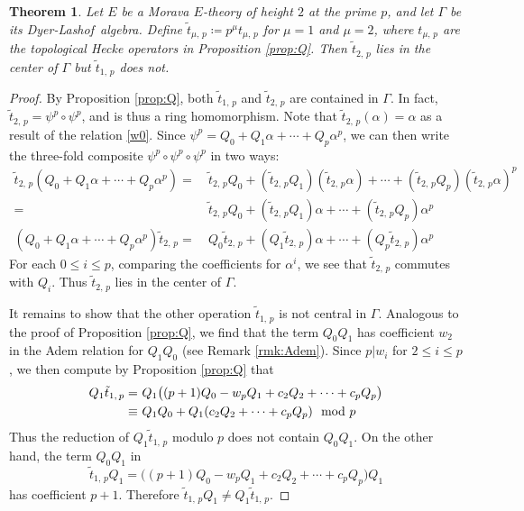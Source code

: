 \documentclass{gtpart}
\newtheorem{thm}{Theorem}
\theoremstyle{definition}
\theoremstyle{remark}
\newcommand{\DL}{Dyer-Lashof~}
\newcommand{\md}{~~{\rm mod}~}
\newcommand{\A}{\alpha}
\newcommand{\G}{\Gamma}
\newcommand{\ce}{\coloneqq}
\renewcommand{\=}{\approx}
\renewcommand{\-}{\sim}
\numberwithin{equation}{section}
\numberwithin{thm}{section}
\begin{document}
\begin{thm}
 \label{thm:center}
 Let $E$ be a Morava $E$-theory of height $2$ at the prime $p$, and let $\G$ be its \DL algebra.  
 Define $\tilde{t}_{\mu,\,p} \ce p^\mu t_{\mu,\,p}$ for $\mu = 1$ and $\mu = 2$, 
 where $t_{\mu,\,p}$ are the topological Hecke operators in Proposition \ref{prop:Q}.  
 Then $\tilde{t}_{2,\,p}$ lies in the center of $\G$ but $\tilde{t}_{1,\,p}$ does not.  
\end{thm}
\begin{proof}
 By Proposition \ref{prop:Q}, both $\tilde{t}_{1,\,p}$ and $\tilde{t}_{2,\,p}$ are 
 contained in $\G$.  In fact, $\tilde{t}_{2,\,p} = \psi^p \circ \psi^p$, and is thus a 
 ring homomorphism.  
 Note that $\tilde{t}_{2,\,p}(\A) = \A$ as a result of the relation \eqref{w0}.  Since 
 $\psi^p = Q_0 + Q_1 \A + \cdots + Q_p \A^p$, we can then write the three-fold 
 composite $\psi^p \circ \psi^p \circ \psi^p$ in two ways: 
 \begin{equation*}
  \begin{split}
   \tilde{t}_{2,\,p} (Q_0 + Q_1 \A + \cdots + Q_p \A^p) = & ~ \tilde{t}_{2,\,p} Q_0 + (\tilde{t}_{2,\,p} Q_1) (\tilde{t}_{2,\,p} \A) + \cdots + (\tilde{t}_{2,\,p} Q_p) (\tilde{t}_{2,\,p} \A)^p \\
                                                        = & ~ \tilde{t}_{2,\,p} Q_0 + (\tilde{t}_{2,\,p} Q_1) \A + \cdots + (\tilde{t}_{2,\,p} Q_p) \A^p \\
   (Q_0 + Q_1 \A + \cdots + Q_p \A^p) \tilde{t}_{2,\,p} = & ~  Q_0 \tilde{t}_{2,\,p} + (Q_1 \tilde{t}_{2,\,p}) \A + \cdots + (Q_p \tilde{t}_{2,\,p}) \A^p 
  \end{split}
 \end{equation*}
 For each $0 \leq i \leq p$, comparing the coefficients for $\A^i$, 
 we see that $\tilde{t}_{2,\,p}$ commutes with $Q_i$.  
 Thus $\tilde{t}_{2,\,p}$ lies in the center of $\G$.  

 It remains to show that the other operation $\tilde{t}_{1,\,p}$ is not central in 
 $\G$.  Analogous to the proof of Proposition \ref{prop:Q}, we find that the term 
 $Q_0 Q_1$ has coefficient $w_2$ in the Adem relation for $Q_1 Q_0$ (see Remark 
 \ref{rmk:Adem}).  Since $p | w_i$ for $2 \leq i \leq p$, we then compute by Proposition \ref{prop:Q} that 
 \begin{equation*}
  \begin{split}
   Q_1 \tilde{t}_{1,\,p} = & ~ Q_1 \big( (p + 1) Q_0 - w_p Q_1 + c_2 Q_2 + \cdots + c_p Q_p \big) \\
                    \equiv & ~ Q_1 Q_0 + Q_1 (c_2 Q_2 + \cdots + c_p Q_p) \md p 
  \end{split}
 \end{equation*}
 Thus the reduction of $Q_1 \tilde{t}_{1,\,p}$ modulo $p$ does not contain $Q_0 Q_1$.  
 On the other hand, the term $Q_0 Q_1$ in 
 \[
  \tilde{t}_{1,\,p} Q_1 = \big( (p + 1) Q_0 - w_p Q_1 + c_2 Q_2 + \cdots + c_p Q_p \big) Q_1 
 \]
 has coefficient $p + 1$.  
 Therefore $\tilde{t}_{1,\,p} Q_1 \neq Q_1 \tilde{t}_{1,\,p}$.  
\end{proof}
\end{document}
